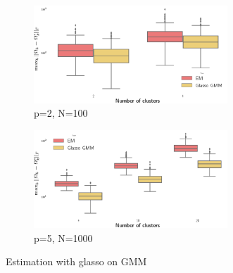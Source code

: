 \begin{figure}
        \captionsetup[subfigure]{aboveskip=-1pt}
        \centering
        \begin{subfigure}[b]{\textwidth}
                \includegraphics[width=0.8\textwidth]{TeX_files/graph_lasso_2_100.png} 
                \caption{p=2, N=100}
                \label{fig:glasso_dim2_N100}
        \end{subfigure}       
        \begin{subfigure}[b]{\textwidth}
                \includegraphics[width=0.8\textwidth]{TeX_files/graph_lasso_5_1000.png}
                \caption{p=5, N=1000}
                \label{fig:glasso_dim5_N1000}
        \end{subfigure}
        \caption{Estimation with glasso on GMM}\label{fig:glasso_res_simu} 
\end{figure}

